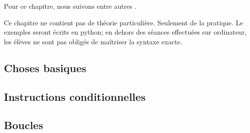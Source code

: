 
Pour ce chapitre, nous suivons entre autres \cite{oklaEg}.

Ce chapitre ne contient pas de théorie particulière. Seulement de la pratique. Le exemples seront écrits en python; en dehors des séances effectuées sur ordinateur, les élèves ne sont pas obligés de maîtriser la syntaxe exacte.

\subsection{Choses basiques}


\subsection{Instructions conditionnelles}


\subsection{Boucles}



